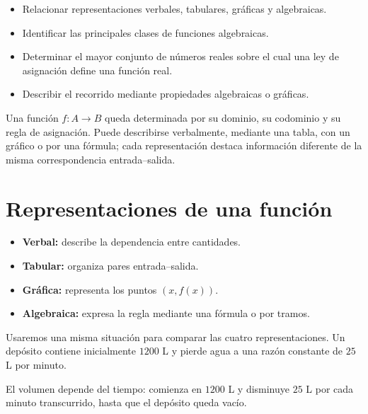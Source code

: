 \documentclass[10pt,a5paper]{article}
\begin{document}
\clearpage


\begin{objetivos}
\begin{itemize}
  \item Relacionar representaciones verbales, tabulares, gráficas y algebraicas.
  \item Identificar las principales clases de funciones algebraicas.
  \item Determinar el mayor conjunto de números reales sobre el cual una ley de asignación define una función real.
  \item Describir el recorrido mediante propiedades algebraicas o gráficas.
\end{itemize}
\end{objetivos}

\begin{resumen}
Una función $f:A\to B$ queda determinada por su dominio, su codominio y su regla de asignación. Puede describirse verbalmente, mediante una tabla, con un gráfico o por una fórmula; cada representación destaca información diferente de la misma correspondencia entrada--salida.
\end{resumen}

\section*{Representaciones de una función}

\begin{definicion}[representaciones]
\begin{itemize}
  \item \textbf{Verbal:} describe la dependencia entre cantidades.
  \item \textbf{Tabular:} organiza pares entrada--salida.
  \item \textbf{Gráfica:} representa los puntos $(x,f(x))$.
  \item \textbf{Algebraica:} expresa la regla mediante una fórmula o por tramos.
\end{itemize}
\end{definicion}

Usaremos una misma situación para comparar las cuatro representaciones. Un depósito contiene inicialmente $1200$ L y pierde agua a una razón constante de $25$ L por minuto.

\begin{ejemplo}
El volumen depende del tiempo: comienza en $1200$ L y disminuye $25$ L por cada minuto transcurrido, hasta que el depósito queda vacío.
\end{ejemplo}
\end{document}
